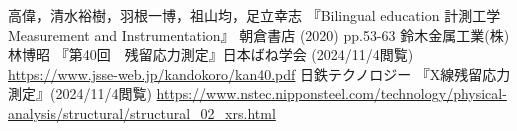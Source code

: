 \begin{thebibliography}{99}
     高偉，清水裕樹，羽根一博，祖山均，足立幸志 『Bilingual education 計測工学 Measurement and Instrumentation』 朝倉書店 (2020) pp.53-63
     鈴木金属工業(株) 林博昭 『第40回　残留応力測定』日本ばね学会 (2024/11/4閲覧)
    \url{https://www.jsse-web.jp/kandokoro/kan40.pdf}
    日鉄テクノロジー 『X線残留応力測定』(2024/11/4閲覧)
    \url{https://www.nstec.nipponsteel.com/technology/physical-analysis/structural/structural_02_xrs.html}
\end{thebibliography}
